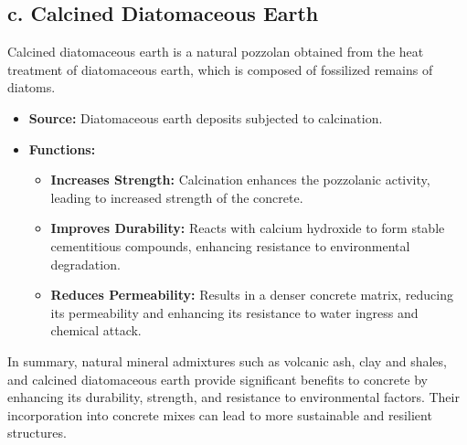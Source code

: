 \documentclass[a4paper,11pt]{book}
\begin{document}
\subsection*{c. Calcined Diatomaceous Earth}
Calcined diatomaceous earth is a natural pozzolan obtained from the heat treatment of diatomaceous earth, which is composed of fossilized remains of diatoms.
\begin{itemize}
    \item \textbf{Source:} Diatomaceous earth deposits subjected to calcination.
    \item \textbf{Functions:}
        \begin{itemize}
            \item \textbf{Increases Strength:} Calcination enhances the pozzolanic activity, leading to increased strength of the concrete.
            \item \textbf{Improves Durability:} Reacts with calcium hydroxide to form stable cementitious compounds, enhancing resistance to environmental degradation.
            \item \textbf{Reduces Permeability:} Results in a denser concrete matrix, reducing its permeability and enhancing its resistance to water ingress and chemical attack.
        \end{itemize}
\end{itemize}

In summary, natural mineral admixtures such as volcanic ash, clay and shales, and calcined diatomaceous earth provide significant benefits to concrete by enhancing its durability, strength, and resistance to environmental factors. Their incorporation into concrete mixes can lead to more sustainable and resilient structures.
\end{document}
